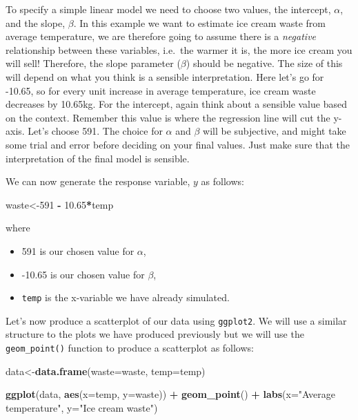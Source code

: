 \documentclass[
]{book}
\newenvironment{Shaded}{\begin{snugshade}}{\end{snugshade}}
\newcommand{\DataTypeTok}[1]{\textcolor[rgb]{0.13,0.29,0.53}{#1}}
\newcommand{\DecValTok}[1]{\textcolor[rgb]{0.00,0.00,0.81}{#1}}
\newcommand{\FloatTok}[1]{\textcolor[rgb]{0.00,0.00,0.81}{#1}}
\newcommand{\KeywordTok}[1]{\textcolor[rgb]{0.13,0.29,0.53}{\textbf{#1}}}
\newcommand{\NormalTok}[1]{#1}
\newcommand{\OperatorTok}[1]{\textcolor[rgb]{0.81,0.36,0.00}{\textbf{#1}}}
\newcommand{\StringTok}[1]{\textcolor[rgb]{0.31,0.60,0.02}{#1}}
\providecommand{\tightlist}{%
  \setlength{\itemsep}{0pt}\setlength{\parskip}{0pt}}
\begin{document}
To specify a simple linear model we need to choose two values, the intercept, \(\alpha\), and the slope, \(\beta\). In this example we want to estimate ice cream waste from average temperature, we are therefore going to assume there is a \emph{negative} relationship between these variables, i.e.~the warmer it is, the more ice cream you will sell! Therefore, the slope parameter (\(\beta\)) should be negative. The size of this will depend on what you think is a sensible interpretation. Here let's go for -10.65, so for every unit increase in average temperature, ice cream waste decreases by 10.65kg. For the intercept, again think about a sensible value based on the context. Remember this value is where the regression line will cut the y-axis. Let's choose 591. The choice for \(\alpha\) and \(\beta\) will be subjective, and might take some trial and error before deciding on your final values. Just make sure that the interpretation of the final model is sensible.

We can now generate the response variable, \(y\) as follows:

\begin{Shaded}
\begin{Highlighting}[]
\NormalTok{waste<-}\DecValTok{591} \OperatorTok{-}\StringTok{ }\FloatTok{10.65}\OperatorTok{*}\NormalTok{temp}
\end{Highlighting}
\end{Shaded}

where

\begin{itemize}
\tightlist
\item
  591 is our chosen value for \(\alpha\),
\item
  -10.65 is our chosen value for \(\beta\),
\item
  \texttt{temp} is the x-variable we have already simulated.
\end{itemize}

Let's now produce a scatterplot of our data using \texttt{ggplot2}. We will use a similar structure to the plots we have produced previously but we will use the \texttt{geom\_point()} function to produce a scatterplot as follows:

\begin{Shaded}
\begin{Highlighting}[]
\NormalTok{data<-}\KeywordTok{data.frame}\NormalTok{(}\DataTypeTok{waste=}\NormalTok{waste, }\DataTypeTok{temp=}\NormalTok{temp)}

\KeywordTok{ggplot}\NormalTok{(data, }\KeywordTok{aes}\NormalTok{(}\DataTypeTok{x=}\NormalTok{temp, }\DataTypeTok{y=}\NormalTok{waste)) }\OperatorTok{+}\StringTok{ }
\StringTok{  }\KeywordTok{geom_point}\NormalTok{() }\OperatorTok{+}\StringTok{ }
\StringTok{  }\KeywordTok{labs}\NormalTok{(}\DataTypeTok{x=}\StringTok{"Average temperature"}\NormalTok{, }\DataTypeTok{y=}\StringTok{"Ice cream waste"}\NormalTok{)}
\end{Highlighting}
\end{Shaded}
\end{document}
